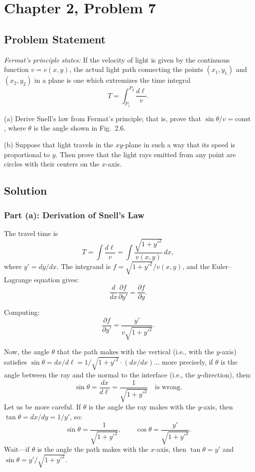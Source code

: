 \documentclass[12pt]{article}
\begin{document}
\section*{Chapter 2, Problem 7}

\subsection*{Problem Statement}
\textit{Fermat's principle states:} If the velocity of light is given by the continuous function $v = v(x,y)$, the actual light path connecting the points $(x_1, y_1)$ and $(x_2, y_2)$ in a plane is one which extremizes the time integral
\[
  T = \int_{P_1}^{P_2} \frac{d\ell}{v}.
\]

\noindent (a) Derive Snell's law from Fermat's principle; that is, prove that $\sin\theta / v = \text{const}$, where $\theta$ is the angle shown in Fig.~2.6.

\noindent (b) Suppose that light travels in the $xy$-plane in such a way that its speed is proportional to $y$. Then prove that the light rays emitted from any point are circles with their centers on the $x$-axis.

\subsection*{Solution}

\subsubsection*{Part (a): Derivation of Snell's Law}

The travel time is
\[
  T = \int \frac{d\ell}{v} = \int \frac{\sqrt{1+y'^2}}{v(x,y)}\,dx,
\]
where $y' = dy/dx$. The integrand is $f = \sqrt{1+y'^2}/v(x,y)$, and the Euler--Lagrange equation gives:
\[
  \frac{d}{dx}\frac{\partial f}{\partial y'} = \frac{\partial f}{\partial y}.
\]

Computing:
\[
  \frac{\partial f}{\partial y'} = \frac{y'}{v\sqrt{1+y'^2}}.
\]

Now, the angle $\theta$ that the path makes with the vertical (i.e., with the $y$-axis) satisfies $\sin\theta = dx/d\ell = 1/\sqrt{1+y'^2} \cdot (dx/dx)$... more precisely, if $\theta$ is the angle between the ray and the normal to the interface (i.e., the $y$-direction), then:
\[
  \sin\theta = \frac{dx}{d\ell} = \frac{1}{\sqrt{1+y'^2}} \quad \text{is wrong}.
\]
Let us be more careful. If $\theta$ is the angle the ray makes with the $y$-axis, then $\tan\theta = dx/dy = 1/y'$, so:
\[
  \sin\theta = \frac{1}{\sqrt{1+y'^2}}, \qquad \cos\theta = \frac{y'}{\sqrt{1+y'^2}}.
\]
Wait---if $\theta$ is the angle the path makes with the $x$-axis, then $\tan\theta = y'$ and $\sin\theta = y'/\sqrt{1+y'^2}$.
\end{document}
